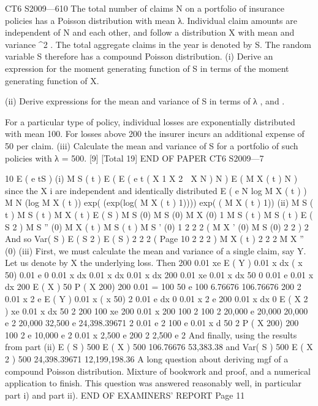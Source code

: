 \documentclass[a4paper,12pt]{article}
\begin{document}
CT6 S2009—610
The total number of claims N on a portfolio of insurance policies has a Poisson
distribution with mean λ. Individual claim amounts are independent of N and each
other, and follow a distribution X with mean \mu and variance \sigma^2  . The total aggregate
claims in the year is denoted by S. The random variable S therefore has a compound
Poisson distribution.
(i) Derive an expression for the moment generating function of S in terms of the
moment generating function of X.

(ii) Derive expressions for the mean and variance of S in terms of λ , \mu and \sigma  .

For a particular type of policy, individual losses are exponentially distributed with
mean 100. For losses above 200 the insurer incurs an additional expense of 50 per
claim.
(iii)
Calculate the mean and variance of S for a portfolio of such policies with
λ = 500.
[9]
[Total 19]
END OF PAPER
CT6 S2009—7

10
E ( e tS )
(i) M S ( t )
E ( E ( e t ( X 1
X 2  X N )
N )
E ( M X ( t ) N ) since the X i are independent and identically distributed
E ( e N log M X ( t ) )
M N (log M X ( t ))
exp( (exp(log( M X ( t ) 1))))
exp( ( M X ( t ) 1))
(ii) M S ( t ) M S ( t ) M X ( t )
E ( S ) M S (0) M S (0)
M X (0)
1
M S ( t ) M S ( t )
E ( S 2 ) M S '' (0)
M X ( t ) M S ( t )
M S ' (0)
1
2 2
2
(
M X ' (0) M S (0)
2
2
)
2
And so
Var( S )
E ( S 2 ) E ( S ) 2
2 2
(
Page 10
2
2
2
)
M X ( t )
2
2 2
M X '' (0)%
(iii) First, we must calculate the mean and variance of a single claim, say Y.
Let us denote by X the underlying loss. Then
200
0.01 xe
E ( Y )
0.01 x
dx
( x 50) 0.01 e
0
0.01 x dx
0.01 x dx
0.01 x dx
200
0.01 xe
0.01 x
dx 50
0
0.01 e
0.01 x
dx
200
E ( X ) 50 P ( X
200)
200 0.01
= 100 50 e
100 6.76676
106.76676
200
2
0.01 x 2 e
E ( Y )
0.01 x
( x 50) 2 0.01 e
dx
0
0.01 x 2 e
200
0.01 x
dx
0
E ( X 2 )
xe
0.01 x
dx 50 2
200
100 xe
200
0.01 x
200
100 2 100 2 20,000 e
20,000 20,000 e 2
20,000 32,500 e
24,398.39671 2
0.01 e
2
100 e
0.01 x
d 50 2 P ( X
200)
200
100 2 e
10,000 e
2
0.01 x
2,500 e
200
2
2,500 e
2
And finally, using the results from part (ii)
E ( S ) 500 E ( X ) 500 106.76676
53,383.38
and
Var( S ) 500 E ( X 2 ) 500 24,398.39671 12,199,198.36
A long question about deriving mgf of a compound Poisson distribution. Mixture of
bookwork and proof, and a numerical application to finish. This question was
answered reasonably well, in particular part i) and part ii).
END OF EXAMINERS’ REPORT
Page 11
\end{document}
